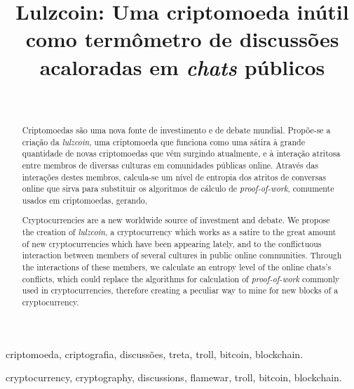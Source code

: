 \documentclass[conference]{IEEEtran}
\begin{document}

\title{Lulzcoin: Uma criptomoeda inútil como termômetro de discussões acaloradas em \textit{chats} públicos}
\author{\\
}

\maketitle


\begin{abstract}
Criptomoedas são uma nova fonte de investimento e de debate mundial. Propõe-se a criação da \textit{lulzcoin}, uma criptomoeda que funciona como uma sátira à grande quantidade de novas criptomoedas que vêm surgindo atualmente, e à interação atritosa entre membros de diversas culturas em comunidades públicas online. Através das interações destes membros, calcula-se um nível de entropia dos atritos de conversas online que sirva para substituir os algoritmos de cálculo de \textit{proof-of-work}, comumente usados em criptomoedas, gerando,
\end{abstract}
\begin{IEEEkeywords}
criptomoeda, criptografia, discussões, treta, troll, bitcoin, blockchain.
\end{IEEEkeywords}

\begin{abstract}
Cryptocurrencies are a new worldwide source of investment and debate. We propose the creation of \textit{lulzcoin}, a cryptocurrency which works as a satire to the great amount of new cryptocurrencies which have been appearing lately, and to the conflictuous interaction between members of several cultures in public online communities. Through the interactions of these members, we calculate an entropy level of the online chats's conflicts, which could replace the algorithms for calculation of \textit{proof-of-work} commonly used in cryptocurrencies, therefore creating a peculiar way to mine for new blocks of a cryptocurrency.
\end{abstract}
\begin{IEEEkeywords}
cryptocurrency, cryptography, discussions, flamewar, troll, bitcoin, blockchain.
\end{IEEEkeywords}

\end{document}
